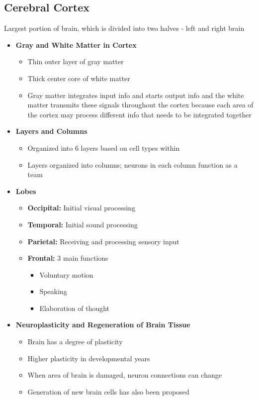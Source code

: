 \documentclass[11pt]{article}
\begin{document}
\subsection{Cerebral Cortex}
Largest portion of brain, which is divided into two halves - left and right brain
\begin{itemize}
\item \textbf{Gray and White Matter in Cortex}
\begin{itemize}
\item Thin outer layer of gray matter
\item Thick center core of white matter
\item Gray matter integrates input info and starts output info and the white matter transmits these signals throughout the cortex because each area of the cortex may process different info that needs to be integrated together
\end{itemize}
\item \textbf{Layers and Columns}
\begin{itemize}
\item Organized into 6 layers based on cell types within
\item Layers organized into columns; neurons in each column function as a team
\end{itemize}
\item \textbf{Lobes}
\begin{itemize}
\item \textbf{Occipital: }Initial visual processing
\item \textbf{Temporal:} Initial sound processing
\item \textbf{Parietal:} Receiving and processing sensory input
\item \textbf{Frontal:} 3 main functions
\begin{itemize}
\item Voluntary motion
\item Speaking
\item Elaboration of thought
\end{itemize}
\end{itemize}
\item \textbf{Neuroplasticity and Regeneration of Brain Tissue}
\begin{itemize}
\item Brain has a degree of plasticity 
\item Higher plasticity in developmental years
\item When area of brain is damaged, neuron connections can change
\item Generation of new brain cells has also been proposed
\end{itemize}
\end{itemize}
\end{document}
